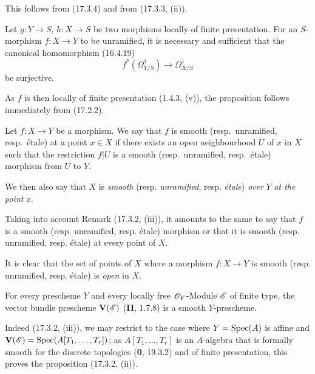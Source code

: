 This follows from (17.3.4) and from (17.3.3, (ii)).

\begin{proposition}[17.3.6]
\label{IV.17.3.6}
Let $g:Y\to S$, $h:X\to S$ be two morphisms locally of finite presentation. For an $S$-morphism $f:X\to Y$ to be unramified, it is necessary and sufficient that the canonical homomorphism \textup{(16.4.19)}
\[
  f^*(\varOmega_{Y/S}^1)\longrightarrow\varOmega_{X/S}^1
\]
be surjective.
\end{proposition}

As $f$ is then locally of finite presentation (1.4.3, (v)), the proposition follows immediately from (17.2.2).

\begin{definition}[17.3.7]\label{IV.17.3.7}
Let $f:X\to Y$ be a morphism. We say that $f$ is smooth \textup{(resp.}\ unramified, \textup{resp.}\ étale\textup{)} at a point $x\in X$ if there exists an open neighbourhood $U$ of $x$ in $X$ such that the restriction $f|U$ is a smooth \textup{(resp.}\ unramified, \textup{resp.}\ étale\textup{)} morphism from $U$ to $Y$.
\end{definition}

We then also say that $X$ is \emph{smooth} (resp. \emph{unramified}, resp. \emph{étale}) \emph{over} $Y$ \emph{at the point} $x$.

Taking into account Remark (17.3.2, (iii)), it amounts to the same to say that $f$ is a smooth (resp. unramified, resp. étale) morphism or that it is smooth (resp. unramified, resp. étale) at every point of $X$.

It is clear that the set of points of $X$ where a morphism $f:X\to Y$ is smooth (resp. unramified, resp. étale) is \emph{open} in $X$.

\begin{proposition}[17.3.8]
\label{IV.17.3.8}
For every prescheme $Y$ and every locally free $\mathscr{O}_Y$-Module $\mathscr{E}$ of finite type, the vector bundle prescheme $\mathbf{V}(\mathscr{E})$ \textup{(\textbf{II}, 1.7.8)} is a smooth $Y$-prescheme.
\end{proposition}

Indeed (17.3.2, (iii)), we may restrict to the case where $Y=\operatorname{Spec}(A)$ is affine and $\mathbf{V}(\mathscr{E})=\operatorname{Spec}(A[T_1,\ldots,T_r])$; as $A[T_1,\ldots,T_r]$ is an $A$-algebra that is formally smooth for the discrete topologies (\textbf{0}, 19.3.2) and of finite presentation, this proves the proposition (17.3.2, (ii)).

